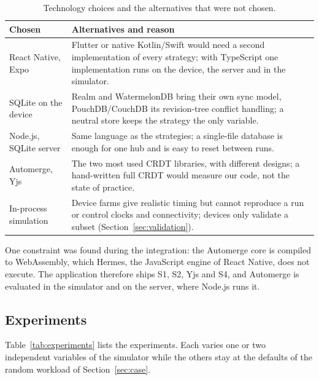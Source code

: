 \begin{table}[ht]
\caption{Technology choices and the alternatives that were not chosen.}
\label{tab:tech}
\footnotesize
\begin{tabular}{@{}>{\raggedright\arraybackslash}p{}>{\raggedright\arraybackslash}p{}@{}}
\toprule
Chosen & Alternatives and reason \\
\midrule
React Native, Expo & Flutter or native Kotlin/Swift would need a second implementation of every strategy; with
  TypeScript one implementation runs on the device, the server and in the simulator. \\
SQLite on the device & Realm and WatermelonDB bring their own sync model, PouchDB/CouchDB its revision-tree conflict
  handling; a neutral store keeps the strategy the only variable. \\
Node.js, SQLite server & Same language as the strategies; a single-file database is enough for one hub and is easy
  to reset between runs. \\
Automerge, Yjs & The two most used CRDT libraries, with different designs; a hand-written full CRDT would measure
  our code, not the state of practice. \\
In-process simulation & Device farms give realistic timing but cannot reproduce a run or control clocks and
  connectivity; devices only validate a subset (Section~\ref{sec:validation}). \\
\bottomrule
\end{tabular}
\end{table}

One constraint was found during the integration: the Automerge core is compiled to WebAssembly, which Hermes, the
JavaScript engine of React Native, does not execute. The application therefore ships S1, S2, Yjs and S4, and
Automerge is evaluated in the simulator and on the server, where Node.js runs it.

\subsection{Experiments}
Table~\ref{tab:experiments} lists the experiments. Each varies one or two independent variables of the simulator
while the others stay at the defaults of the random workload of Section~\ref{sec:case}.

